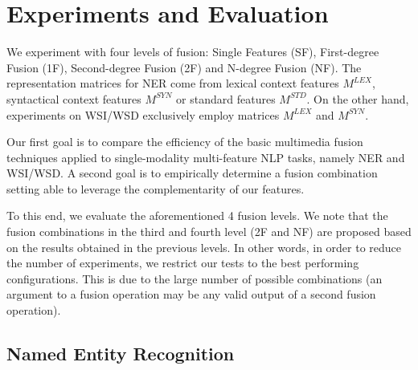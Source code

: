 \documentclass{llncs}
\begin{document}




\section{Experiments and Evaluation}


We experiment with four levels of fusion: Single Features (SF), First-degree Fusion (1F), Second-degree Fusion (2F) and N-degree Fusion (NF). The representation matrices for NER come from lexical context features $M^{LEX}$, syntactical context features $M^{SYN}$ or standard features $M^{STD}$.  On the other hand, experiments on WSI/WSD exclusively employ matrices $M^{LEX}$ and $M^{SYN}$.

Our first goal is to compare the efficiency of the basic multimedia fusion techniques applied to  single-modality multi-feature NLP tasks, namely NER and WSI/WSD. A second goal is to empirically determine a fusion combination setting able to leverage the complementarity of our features.

To this end, we evaluate the aforementioned 4 fusion levels. We note that the fusion combinations in the third and fourth level (2F and NF) are proposed based on the results obtained in the previous levels. In other words, in order to reduce the number of experiments, we restrict our tests to the best performing configurations. This is due to the large number of possible combinations (an argument to a fusion operation may be any valid output of a second fusion operation).


\subsection{Named Entity Recognition}
\end{document}
